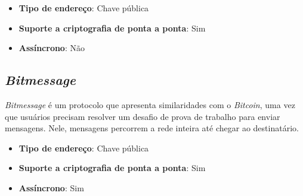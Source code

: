 \begin{itemize}
  \item \textbf{Tipo de endereço}: Chave pública
  \item \textbf{Suporte a criptografia de ponta a ponta}: Sim
  \item \textbf{Assíncrono}: Não
\end{itemize}

\subsection{\textit{Bitmessage}}

\textit{Bitmessage} é um protocolo que apresenta similaridades com o \textit{Bitcoin}, uma vez que usuários precisam resolver um desafio de prova de trabalho para enviar mensagens. Nele, mensagens percorrem a rede inteira até chegar ao destinatário. \cite{bitmessage}

\begin{itemize}
  \item \textbf{Tipo de endereço}: Chave pública
  \item \textbf{Suporte a criptografia de ponta a ponta}: Sim
  \item \textbf{Assíncrono}: Sim
\end{itemize}